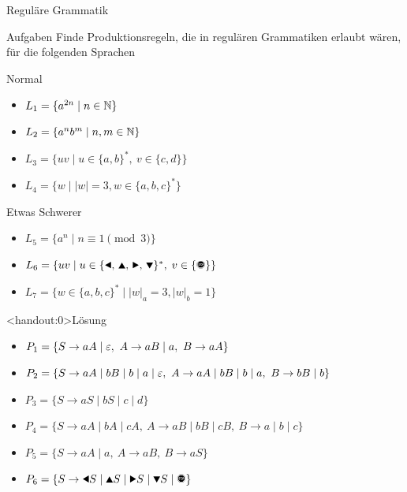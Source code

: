 {
\begin{frame}{Reguläre Grammatik}
    \begin{alertblock}{Aufgaben}
    Finde Produktionsregeln, die in regulären Grammatiken erlaubt wären, für die folgenden Sprachen
    \end{alertblock}
    \begin{block}{Normal}
    \begin{itemize}
        \item $L_1 = \{a^{2n} \mid n\in\mathbb{N}\}$
        \item $L_2 = \{a^nb^m \mid n, m\in\mathbb{N}\}$
        \item $L_3 = \{uv \mid u\in\{a,b\}^\ast,\ v\in\{c,d\}\}$
        \item $L_4 = \{w \mid |w| = 3, w\in \{a,b,c\}^*\}$
    \end{itemize}
    \end{block}
    \begin{block}{Etwas Schwerer}
    \begin{itemize}
        \item $L_5 = \{a^n \mid n \equiv 1 \pmod 3\}$
        \item $L_6 = \{uv\mid u\in\{\text{\Rewind, \MoveUp, \Forward, \MoveDown}\}^\ast,\;v\in\{\text{\Stopsign}\}\}$
        \item $L_7 = \{w \in \{a,b,c\}^* \mid |w|_a = 3, |w|_b = 1\}$
    \end{itemize}
    \end{block}
\end{frame}
}

{
\begin{frame}<handout:0>{Lösung}
    \begin{itemize}
        \item<1-> \alert<1>{$P_1 = \{S \to aA \mid \varepsilon,\ A \to aB \mid a,\ B \to aA\}$}
        \item<2-> \alert<2>{$P_2 = \{S \to aA \mid bB \mid b \mid a \mid \varepsilon,\ A \to aA \mid bB \mid b \mid a ,\ B \to bB \mid b\}$}
        \item<3-> \alert<3>{$P_3 = \{S \to aS \mid bS \mid c \mid d\}$}
        \item<4-> \alert<4>{$P_4 = \{S \to aA \mid bA \mid cA,\ A \to aB \mid bB \mid cB,\ B \to a \mid b \mid c\}$}
        \item<5-> \alert<5>{$P_5 = \{S \to aA \mid a,\ A \to aB,\ B \to aS\}$}
        \item<6-> \alert<6>{$P_6 = \{S \to \text{\Rewind}S \mid \text{\MoveUp}S \mid \text{\Forward}S \mid \text{\MoveDown}S \mid \text{\Stopsign}\}$}
    \end{itemize}
\end{frame}
}


